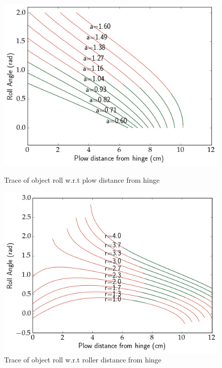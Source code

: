 \documentclass[a4paper]{article}
\begin{document}
\begin{figure}[!ht]
  \centering
  \begin{minipage}[b]{0.4\textwidth}
    \includegraphics[width=1.0\textwidth]{PlowFlipTrace.png}
    \caption{\label{fig:plow}Trace of object roll w.r.t plow distance from hinge}
  \end{minipage}
  \hfill
  \begin{minipage}[b]{0.4\textwidth}
    \includegraphics[width=1.0\textwidth]{RollerFlipTrace.png}
    \caption{\label{fig:roller}Trace of object roll w.r.t roller distance from hinge}
  \end{minipage}
\end{figure}
\end{document}
